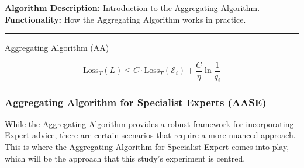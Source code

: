 \textbf{Algorithm Description:} Introduction to the Aggregating Algorithm.\newline
\textbf{Functionality:} How the Aggregating Algorithm works in practice.\newline
\noindent\rule{\textwidth}{0.1pt}
\begin{algorithm}[ht]
    \caption{Aggregating Algorithm (AA)}\label{algorithm:aggregationg_algorithm}
    \begin{algorithmic}[1]
    \end{algorithmic}
\end{algorithm}

\begin{equation}
    \text{Loss}_T(L) \leq C \cdot \text{Loss}_T(\mathcal{E}_i) + \frac{C}{\eta}\ln\frac{1}{q_i}
\end{equation}

\subsubsection{Aggregating Algorithm for Specialist Experts (AASE)}\label{subsubsection:aggregating_algorithm_for_specialist_experts}
While the Aggregating Algorithm provides a robust framework for incorporating Expert advice, there are certain scenarios that require a more nuanced approach. This is where the Aggregating Algorithm for Specialist Expert comes into play, which will be the approach that this study's experiment is centred.

